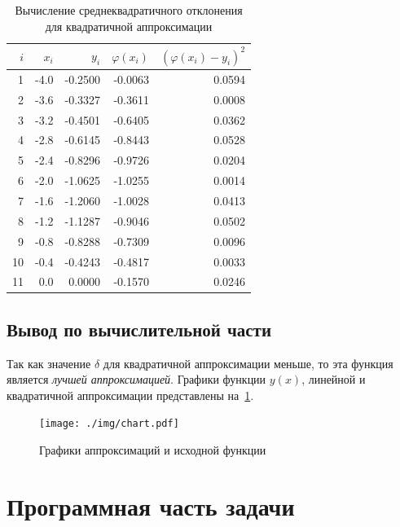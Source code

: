 \begin{table}
  \caption{Вычисление среднеквадратичного отклонения для квадратичной аппроксимации}\label{table:std_quadratic}
  \centering
  \begin{tabular}{rrrrr}
    \toprule
    \(i\) & \(x_i\) & \(y_i\) & \(\varphi(x_i)\) & \({(\varphi(x_i) - y_i)}^2\) \\
    \midrule
    1 & -4.0 & -0.2500 & -0.0063 & 0.0594 \\
    2 & -3.6 & -0.3327 & -0.3611 & 0.0008 \\
    3 & -3.2 & -0.4501 & -0.6405 & 0.0362 \\
    4 & -2.8 & -0.6145 & -0.8443 & 0.0528 \\
    5 & -2.4 & -0.8296 & -0.9726 & 0.0204 \\
    6 & -2.0 & -1.0625 & -1.0255 & 0.0014 \\
    7 & -1.6 & -1.2060 & -1.0028 & 0.0413 \\
    8 & -1.2 & -1.1287 & -0.9046 & 0.0502 \\
    9 & -0.8 & -0.8288 & -0.7309 & 0.0096 \\
    10 & -0.4 & -0.4243 & -0.4817 & 0.0033 \\
    11 & 0.0 & 0.0000 & -0.1570 & 0.0246 \\
    \bottomrule
  \end{tabular}
\end{table}

\subsection{Вывод по вычислительной части}
Так как значение \(\delta\) для квадратичной аппроксимации меньше, то
эта функция является \emph{лучшей аппроксимацией}.
Графики функции \(y(x)\), линейной и квадратичной аппроксимации 
представлены на~\cref{fig:chart}.

\begin{figure}
  \centering
  \texttt{[image: ./img/chart.pdf]}
  \caption{Графики аппроксимаций и исходной функции}\label{fig:chart}
\end{figure}

\section{Программная часть задачи}
\inputminted[breaklines]{Python}{../solution/solution.py}

